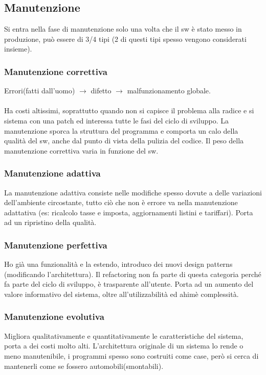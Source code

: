 \documentclass[a4paper,12pt]{report}
\begin{document}
	\subsection{Manutenzione}
	Si entra nella fase di manutenzione solo una volta che il sw è stato messo in produzione, può essere di 3/4 tipi (2 di questi tipi spesso vengono considerati insieme). 
	\subsubsection{Manutenzione correttiva}
	Errori(fatti dall’uomo) $\rightarrow$ difetto $\rightarrow$ malfunzionamento globale. \\\\
	Ha costi altissimi, soprattutto quando non si capisce il problema alla radice e si sistema con una patch ed interessa tutte le fasi del ciclo di sviluppo. La manutenzione sporca la struttura del programma e comporta un calo della qualità del sw, anche dal punto di vista della pulizia del codice. Il peso della manutenzione correttiva varia in funzione del sw.
	\subsubsection{Manutenzione adattiva}
	La manutenzione adattiva consiste nelle modifiche spesso dovute a delle variazioni dell'ambiente circostante, tutto ciò che non è errore va nella manutenzione adattativa (es: ricalcolo tasse e imposta, aggiornamenti listini e tariffari). Porta ad un ripristino della qualità.
	\subsubsection{Manutenzione perfettiva}
	Ho già una funzionalità e la estendo, introduco dei nuovi design patterns (modificando l’architettura). Il refactoring non fa parte di questa categoria perché fa parte del ciclo di sviluppo, è trasparente all’utente. Porta ad un aumento del valore informativo del sistema, oltre all'utilizzabilità ed ahimè complessità.
	\subsubsection{Manutenzione evolutiva}
	Migliora qualitativamente e quantitativamente le caratteristiche del sistema, porta a dei costi molto alti.
	L’architettura originale di un sistema lo rende o meno manutenibile, 
	i programmi spesso sono costruiti come case, però si cerca di mantenerli come se fossero automobili(smontabili).
	
\end{document}
